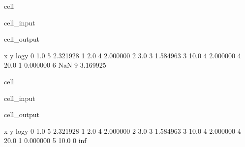 \documentclass[letterpaper,10pt,english]{jupyterBook}
\begin{document}
\begin{sphinxuseclass}{cell}\begin{sphinxVerbatimInput}

\begin{sphinxuseclass}{cell_input}
\begin{sphinxVerbatim}[commandchars=\\\{\}]
\PYG{p}{[}\PYG{p}{[}\PYG{p}{]}\PYG{p}{]}
\end{sphinxVerbatim}

\end{sphinxuseclass}\end{sphinxVerbatimInput}
\begin{sphinxVerbatimOutput}

\begin{sphinxuseclass}{cell_output}
\begin{sphinxVerbatim}[commandchars=\\\{\}]
      x  y     log\PYGZus{}y
0   1.0  5  2.321928
1   2.0  4  2.000000
2   3.0  3  1.584963
3  10.0  4  2.000000
4  20.0  1  0.000000
6   NaN  9  3.169925
\end{sphinxVerbatim}

\end{sphinxuseclass}\end{sphinxVerbatimOutput}

\end{sphinxuseclass}
\begin{sphinxuseclass}{cell}\begin{sphinxVerbatimInput}

\begin{sphinxuseclass}{cell_input}
\begin{sphinxVerbatim}[commandchars=\\\{\}]
\PYG{p}{[}\PYG{p}{[}\PYG{p}{]}\PYG{p}{]}
\end{sphinxVerbatim}

\end{sphinxuseclass}\end{sphinxVerbatimInput}
\begin{sphinxVerbatimOutput}

\begin{sphinxuseclass}{cell_output}
\begin{sphinxVerbatim}[commandchars=\\\{\}]
      x  y     log\PYGZus{}y
0   1.0  5  2.321928
1   2.0  4  2.000000
2   3.0  3  1.584963
3  10.0  4  2.000000
4  20.0  1  0.000000
5 \PYGZhy{}10.0  0      \PYGZhy{}inf
\end{sphinxVerbatim}

\end{sphinxuseclass}\end{sphinxVerbatimOutput}

\end{sphinxuseclass}
\end{document}
